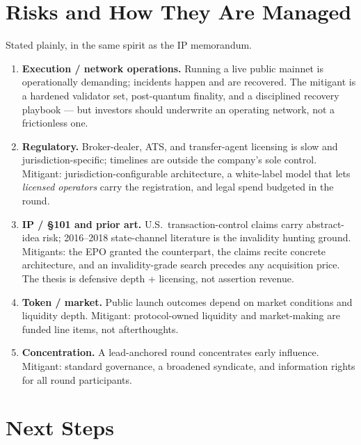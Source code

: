 \documentclass[11pt,a4paper]{article}
\begin{document}
\section{Risks and How They Are Managed}

Stated plainly, in the same spirit as the IP memorandum.

\begin{enumerate}[leftmargin=1.6em]
  \item \textbf{Execution / network operations.} Running a live public
  mainnet is operationally demanding; incidents happen and are recovered.
  The mitigant is a hardened validator set, post-quantum finality, and a
  disciplined recovery playbook --- but investors should underwrite an
  operating network, not a frictionless one.
  \item \textbf{Regulatory.} Broker-dealer, ATS, and transfer-agent
  licensing is slow and jurisdiction-specific; timelines are outside the
  company's sole control. Mitigant: jurisdiction-configurable architecture,
  a white-label model that lets \emph{licensed operators} carry the
  registration, and legal spend budgeted in the round.
  \item \textbf{IP / \S101 and prior art.} U.S.\ transaction-control claims
  carry abstract-idea risk; 2016--2018 state-channel literature is the
  invalidity hunting ground. Mitigants: the EPO granted the counterpart, the
  claims recite concrete architecture, and an invalidity-grade search
  precedes any acquisition price. The thesis is defensive depth + licensing,
  not assertion revenue.
  \item \textbf{Token / market.} Public launch outcomes depend on market
  conditions and liquidity depth. Mitigant: protocol-owned liquidity and
  market-making are funded line items, not afterthoughts.
  \item \textbf{Concentration.} A lead-anchored round concentrates early
  influence. Mitigant: standard governance, a broadened syndicate, and
  information rights for all round participants.
\end{enumerate}

\section{Next Steps}
\end{document}
